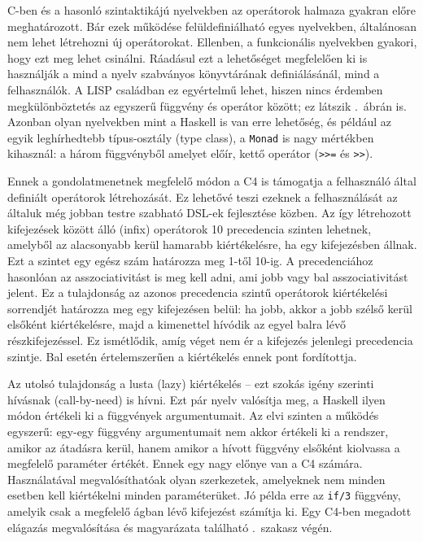 C-ben és a hasonló szintaktikájú nyelvekben az operátorok halmaza gyakran előre meghatározott.
Bár ezek működése felüldefiniálható egyes nyelvekben, általánosan nem lehet létrehozni új operátorokat.
Ellenben, a funkcionális nyelvekben gyakori, hogy ezt meg lehet csinálni. Ráadásul ezt a lehetőséget megfelelően ki is használják a mind a nyelv szabványos könyvtárának definiálásánál, mind a felhasználók.
A LISP családban ez egyértelmű lehet, hiszen nincs érdemben megkülönböztetés az egyszerű függvény és operátor között; ez látszik .~ábrán is.
Azonban olyan nyelvekben mint a Haskell is van erre lehetőség, és például az egyik leghírhedtebb típus-osztály (type class), a {\tt Monad} is nagy mértékben kihasznál: a három függvényből amelyet előír, kettő operátor ({\tt >>=} és {\tt >>}).

Ennek a gondolatmenetnek megfelelő módon a C4 is támogatja a felhasználó által definiált operátorok létrehozását.
Ez lehetővé teszi ezeknek a felhasználását az általuk még jobban testre szabható \gls{DSL}-ek fejlesztése közben.
Az így létrehozott kifejezések között álló (infix) operátorok 10 precedencia szinten lehetnek, amelyből az alacsonyabb kerül hamarabb kiértékelésre, ha egy kifejezésben állnak.
Ezt a szintet egy egész szám határozza meg 1-től 10-ig.
A precedenciához hasonlóan az asszociativitást is meg kell adni, ami jobb vagy bal asszociativitást jelent.
Ez a tulajdonság az azonos precedencia szintű operátorok kiértékelési sorrendjét határozza meg egy kifejezésen belül: ha jobb, akkor a jobb szélső kerül elsőként kiértékelésre, majd a kimenettel hívódik az egyel balra lévő részkifejezéssel.
Ez ismétlődik, amíg véget nem ér a kifejezés jelenlegi precedencia szintje.
Bal esetén értelemszerűen a kiértékelés ennek pont fordítottja.

Az utolsó tulajdonság a lusta (lazy) kiértékelés -- ezt szokás igény szerinti hívásnak (call-by-need) is hívni. 
Ezt pár nyelv valósítja meg, \pl a Haskell ilyen módon értékeli ki a függvények argumentumait. 
Az elvi szinten a működés egyszerű: egy-egy függvény argumentumait nem akkor értékeli ki a rendszer, amikor az átadásra kerül, hanem amikor
a hívott függvény elsőként kiolvassa a megfelelő paraméter értékét. 
Ennek egy nagy előnye van a C4 számára. 
Használatával megvalósíthatóak olyan szerkezetek, amelyeknek nem minden esetben kell kiértékelni minden paraméterüket. 
Jó példa erre az {\tt if/3} függvény, amelyik csak a megfelelő ágban lévő kifejezést számítja ki.
Egy C4-ben megadott elágazás megvalósítása és magyarázata található .~szakasz végén.

